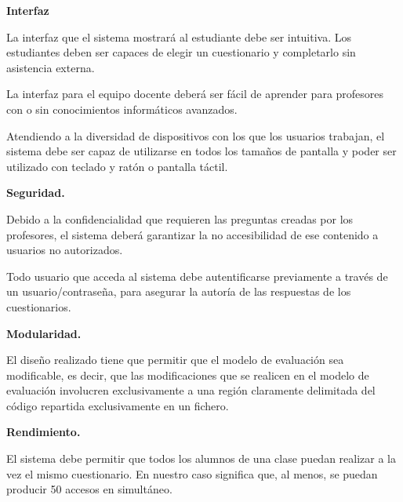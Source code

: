 \begin{rnf0}
	\item \textbf{Interfaz}
		\begin{rnf0*}
			\item La interfaz que el sistema mostrará al estudiante debe ser intuitiva. Los estudiantes deben ser capaces de elegir un cuestionario y completarlo sin asistencia externa. %
			\item La interfaz para el equipo docente deberá ser fácil de aprender para profesores con o sin conocimientos informáticos avanzados. 
			\item Atendiendo a la diversidad de dispositivos con los que los usuarios trabajan, el sistema debe ser capaz de utilizarse en todos los tamaños de pantalla y poder ser utilizado con teclado y ratón o pantalla táctil.
		\end{rnf0*}
	\item \textbf{Seguridad.}
		\begin{rnf0*}
			\item Debido a la confidencialidad que requieren las preguntas creadas por los profesores, el sistema deberá garantizar la no accesibilidad de ese contenido a usuarios no autorizados.
			\item Todo usuario que acceda al sistema debe autentificarse previamente a través de un usuario/contraseña, para asegurar la autoría de las respuestas de los cuestionarios.
		\end{rnf0*}
	\item \textbf{Modularidad.}
		\begin{rnf0*}
			\item El diseño realizado tiene que permitir que el modelo de evaluación sea modificable, es decir, que las modificaciones que se realicen en el modelo de evaluación involucren exclusivamente a una región claramente delimitada del código repartida exclusivamente en un fichero. \label{RNF:mofularidad}
		\end{rnf0*}
	\item \textbf{Rendimiento.}
		\begin{rnf0*}
			\item El sistema debe permitir que todos los alumnos de una clase puedan realizar a la vez el mismo cuestionario. En nuestro caso significa que, al menos, se puedan producir 50 accesos en simultáneo.
		\end{rnf0*}
\end{rnf0}


